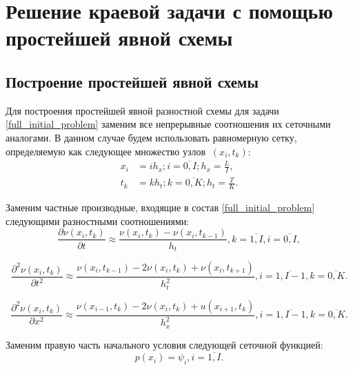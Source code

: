 \section{Решение краевой задачи с помощью простейшей явной схемы}
{
	\subsection{Построение простейшей явной схемы}{
			Для построения простейшей явной разностной схемы для задачи \eqref{full_initial_problem} заменим все непрерывные соотношения их сеточными аналогами. В данном случае будем использовать равномерную сетку, определяемую как следующее множество узлов $\ (x_{i}, t_{k}) $:
			\begin{equation} \label{grid_xt}
				\begin{split}
				x_{i} &= ih_x; i = \overline{ 0, I}; h_x = \frac{L}{I},\\
				t_{k} &= kh_t; k = \overline{ 0, K}; h_t = \frac{T}{K}.
				\end{split}
			\end{equation}
			
		
			Заменим частные производные, входящие в состав \eqref{full_initial_problem} следующими 
			разностными соотношениями:
			\begin{equation} \label{time_analog_1}
		 		\frac{\partial \nu(x_i, t_k)}{\partial t} \approx \frac{\nu(x_i, t_k) - \nu(x_i, t_{k-1})}{h_t}, k =  \overline{ 1, I}, i =  \overline{ 0, I},
			\end{equation}
			
			\begin{equation} \label{time_analog}
		 		\frac{\partial^2 \nu(x_i, t_k)}{\partial t^2} \approx \frac{\nu(x_i, t_{k-1}) - 2\nu(x_i, t_k) + \nu(x_i, t_{k+1})}{h_t^2},  i =  \overline{ 1, I-1}, k =  \overline{ 0, K}.
			\end{equation}
			
			\begin{equation} \label{dimensional_analog}
			\frac{\partial^2 \nu(x_i, t_k)}{\partial x^2} \approx \frac{\nu(x_{i-1}, t_k) - 2\nu(x_i, t_k) + u(x_{i+1}, t_k)}{h_x^2},  i =  \overline{ 1, I-1}, k =  \overline{ 0, K}.
			\end{equation}
			
			Заменим правую часть начального условия следующей сеточной функцией:
			\begin{equation} \label{gamma_tk}
				p(x_i) = \psi_i, i = \overline{1, I}.
			\end{equation}
			
}}
